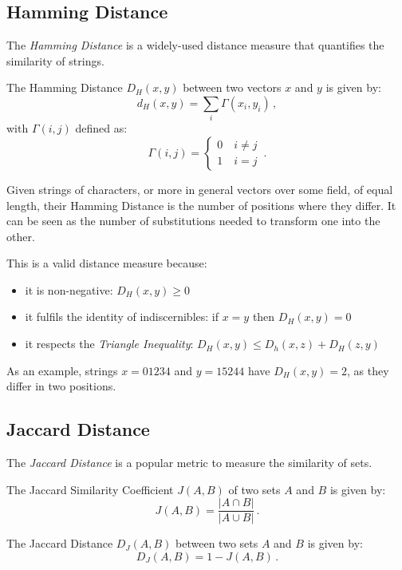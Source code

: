 \subsection{Hamming Distance} \label{subsec:hamming-distance}
The \textit{Hamming Distance} is a widely-used distance measure that quantifies the similarity of strings.
\begin{definition} \label{def:hamming}
	The Hamming Distance $D_H(x,y)$ between two vectors $x$ and $y$ is given by:
	\begin{equation}
		d_H(x,y) = \sum\limits_i \Gamma(x_i, y_i) \,,
	\end{equation}
	with $\Gamma(i,j)$ defined as:
	\begin{equation}
		\Gamma(i,j) = 
		\begin{cases}
			0 \quad i \neq j \\
			1 \quad i = j	
		\end{cases} \,.
	\end{equation}
\end{definition}
Given strings of characters, or more in general vectors over some field, of equal length, their Hamming Distance is the number of positions where they differ.
It can be seen as the number of substitutions needed to transform one into the other.

This is a valid distance measure because:
\begin{itemize}
  \item it is non-negative: $D_H(x,y) \geq 0$
  \item it fulfils the identity of indiscernibles: if $x = y$ then $D_H(x,y)=0$
  \item it respects the \textit{Triangle Inequality}: $D_H(x,y) \leq D_h(x,z) + D_H(z,y) $
\end{itemize}

As an example, strings $x=01234$ and $y=15244$ have $D_H(x,y)=2$, as they differ in two positions.

\subsection{Jaccard Distance} \label{subsec:jaccard-distance}
The \textit{Jaccard Distance} is a popular metric to measure the similarity of sets.
\begin{definition} \label{def:jaccard}
	The Jaccard Similarity Coefficient $J(A,B)$ of two sets $A$ and $B$ is given by:
	\begin{equation*}
		J(A,B) = \frac{|A \cap B |}{| A \cup B |} \,.
	\end{equation*}
\end{definition}
\begin{definition}
	The Jaccard Distance $D_J(A,B)$ between two sets $A$ and $B$ is given by:
	\begin{equation*}
		D_J(A,B) = 1 - J(A,B) \,.
	\end{equation*}
\end{definition}

